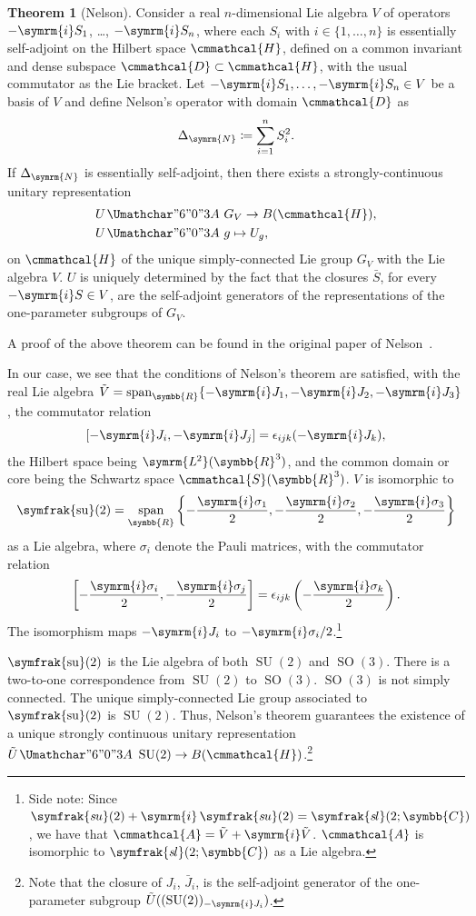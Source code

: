 \documentclass[12pt, a4 paper]{article}
\renewcommand{\symcal}{\cmmathcal}
\theoremstyle{definition}
\newtheorem{thm}{Theorem}
\newcommand{\ltwo}{\symrm{L\kern-0.3pt^2}}
\newcommand{\ltworthree}{\ltwo(\rr^3)}
\newcommand{\rr}{\symbb{R}}
\newcommand{\cc}{\symbb{C}}
\newcommand{\hilbert}{\symcal{H}}
\newcommand{\schwartz}{\symcal{S}}
\newcommand{\schwartzrthree}{\schwartz(\rr^3)}
\renewcommand{\i}{\symrm{i}}
\newcommand{\domain}{\symcal{D}}
\DeclareMathOperator{\spann}{span}
\newcommand{\sutwo}{\operatorname{\symfrak{su}}(2)}
\newcommand{\SUtwo}{\operatorname{SU}(2)}
\newcommand{\SOthree}{\operatorname{SO}(3)}
\renewcommand{\colon}{\nobreak\mskip2mu\mathpunct{}\nonscript
  \mkern-\thinmuskip{\Umathchar"6 "0 "3A}\mskip6muplus1mu\relax}
\begin{document}
    \begin{thm}[Nelson]
        Consider a real \(n\)-dimensional Lie algebra \(V\) of operators \(-\i S_1\), \dots, \(-\i S_n\), where each \(S_i\) with \(i \in \{1, \dots, n\}\) is essentially self-adjoint on the Hilbert space \(\hilbert\), defined on a common invariant and dense subspace \(\domain \subset \hilbert\), with the usual commutator as the Lie bracket.
        Let \(-\i S_1, \dots, -\i S_n \in V\) be a basis of \(V\) and define Nelson's operator with domain \(\domain\) as
        \[
            \Delta_{\symrm{N}} \coloneq \sum_{i=1}^{n} S_i^2.
        \]
        If \(\Delta_{\symrm{N}}\) is essentially self-adjoint, then there exists a strongly-continuous unitary representation
        \begin{align*}
            U &\colon G_V \rightarrow B(\hilbert),\\
            U &\colon g \mapsto U_g,
        \end{align*}
        on \(\hilbert\) of the unique simply-connected Lie group \(G_V\) with the Lie algebra \(V\).
        \(U\) is uniquely determined by the fact that the closures \(\bar{S}\), for every \(-\i S \in V\), are the self-adjoint generators of the representations of the one-parameter subgroups of \(G_V\).
    \end{thm}
    A proof of the above theorem can be found in the original paper of Nelson~\cite{Nelson}.

    In our case, we see that the conditions of Nelson's theorem are satisfied, with the real Lie algebra \(\tilde{V} = \spann_{\rr}\{-\i J_1, -\i J_2, -\i J_3\}\), the commutator relation \[[-\i J_i, -\i J_j] = \epsilon_{ijk}(-\i J_k),\] the Hilbert space being \(\ltworthree\), and the common domain or core  being the Schwartz space \(\schwartzrthree\). \(V\) is isomorphic to \[\displaystyle\sutwo = \spann_{\rr}\left\{-\frac{\i\sigma_1}{2}, -\frac{\i\sigma_2}{2}, -\frac{\i\sigma_3}{2}\right\}\] as a Lie algebra, where \(\sigma_i\) denote the Pauli matrices, with the commutator relation \[\displaystyle\left[-\frac{\i\sigma_i}{2}, -\frac{\i\sigma_j}{2}\right] = \epsilon_{ijk}\left(-\frac{\i\sigma_k}{2}\right).\] The isomorphism maps \(-\i J_i\) to \(-\i \sigma_i/2\).\footnote{Side note: Since \(\symfrak{s\kern-0.6ptu}(2) + \i\,\symfrak{s\kern-0.6ptu}(2) = \symfrak{s\kern-0.8ptl}(2;\cc)\), we have that \(\symcal{A} = \tilde{V} + \i \tilde{V}\). \(\symcal{A}\) is isomorphic to \(\symfrak{s\kern-0.8ptl}(2;\cc)\) as a Lie algebra.}

    \(\sutwo\) is the Lie algebra of both \(\SUtwo\) and \(\SOthree\). There is a two-to-one correspondence from \(\SUtwo\) to \(\SOthree\). \(\SOthree\) is not simply connected. The unique simply-connected Lie group associated to \(\sutwo\) is \(\SUtwo\). Thus, Nelson's theorem guarantees the existence of a unique strongly continuous unitary representation \(\tilde{U} \colon \SUtwo \rightarrow B(\hilbert)\).\footnote{Note that the closure of \(J_i\), \(\bar{J}_i\), is the self-adjoint generator of the one-parameter subgroup \( \tilde{U}( (\SUtwo)_{-\i J_i}) \).}
\end{document}
